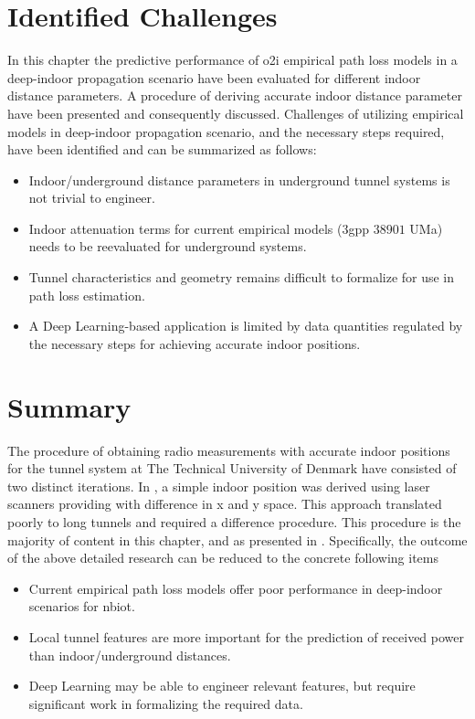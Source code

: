 \section{Identified Challenges}
In this chapter the predictive performance of \gls{o2i} empirical path loss models in a deep-indoor propagation scenario have been evaluated for different indoor distance parameters. A procedure of deriving accurate indoor distance parameter have been presented and consequently discussed. Challenges of utilizing empirical models in deep-indoor propagation scenario, and the necessary steps required, have been identified and can be summarized as follows:

\begin{itemize}
    \item Indoor/underground distance parameters in underground tunnel systems is not trivial to engineer.
    \item Indoor attenuation terms for current empirical models (\gls{3gpp} $38901$ UMa) needs to be reevaluated for underground systems.
    \item Tunnel characteristics and geometry remains difficult to formalize for use in path loss estimation.
    \item A Deep Learning-based application is limited by data quantities regulated by the necessary steps for achieving accurate indoor positions.
\end{itemize}


\section{Summary}
The procedure of obtaining radio measurements with accurate indoor positions for the tunnel system at The Technical University of Denmark have consisted of two  distinct iterations. In \cite{Malarski2019InvestigationAttenuation}, a simple indoor position was derived using laser scanners providing with difference in x and y space. This approach translated poorly to long tunnels and required a difference procedure. This procedure is the majority of content in this chapter, and as presented in \cite{Thrane2020ExperimentalScenario}. Specifically, the outcome of the above detailed research can be reduced to the concrete following items

\begin{itemize}
    \item Current empirical path loss models offer poor performance in deep-indoor scenarios for \gls{nbiot}.
    \item Local tunnel features are more important for the prediction of received power than indoor/underground distances.
    \item Deep Learning may be able to engineer relevant features, but require significant work in formalizing the required data.
\end{itemize}
